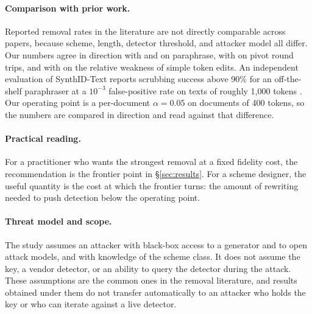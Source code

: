 \paragraph{Comparison with prior work.}
Reported removal rates in the literature are not directly comparable across papers, because scheme, length, detector threshold, and attacker model all differ. Our numbers agree in direction with \citet{kgwreliability} and \citet{dipper} on paraphrase, with \citet{cwra} on pivot round trips, and with \citet{markmywords} on the relative weakness of simple token edits. An independent evaluation of SynthID-Text reports scrubbing success above 90\% for an off-the-shelf paraphraser at a \(10^{-3}\) false-positive rate on texts of roughly 1,000 tokens \citep{probingsynthid}. Our operating point is a per-document \(\alpha = 0.05\) on documents of 400 tokens, so the numbers are compared in direction and read against that difference. 

\paragraph{Practical reading.}
For a practitioner who wants the strongest removal at a fixed fidelity cost, the recommendation is the frontier point in \S\ref{sec:results}. For a scheme designer, the useful quantity is the cost at which the frontier turns: the amount of rewriting needed to push detection below the operating point. 

\paragraph{Threat model and scope.}
The study assumes an attacker with black-box access to a generator and to open attack models, and with knowledge of the scheme class. It does not assume the key, a vendor detector, or an ability to query the detector during the attack. These assumptions are the common ones in the removal literature, and results obtained under them do not transfer automatically to an attacker who holds the key or who can iterate against a live detector.
